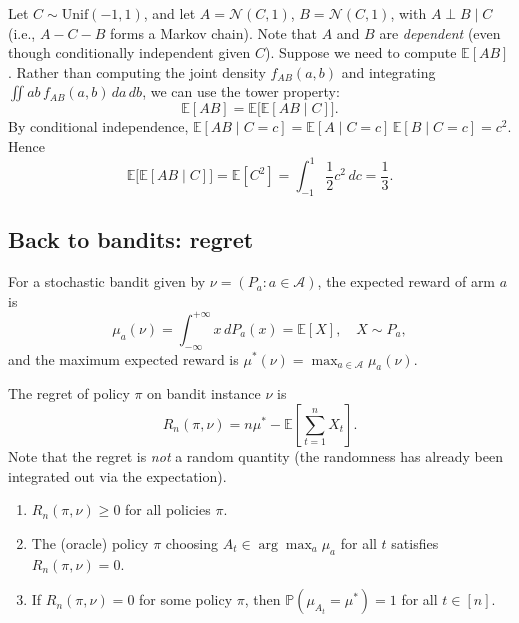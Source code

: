 \begin{example}
Let $C \sim \mathrm{Unif}(-1,1)$, and let $A = \mathcal{N}(C,1)$, $B = \mathcal{N}(C,1)$, with $A \perp B \mid C$ (i.e., $A - C - B$ forms a Markov chain). Note that $A$ and $B$ are \emph{dependent} (even though conditionally independent given $C$). Suppose we need to compute $\mathbb{E}[AB]$. Rather than computing the joint density $f_{AB}(a,b)$ and integrating $\iint ab\, f_{AB}(a,b)\, da\, db$, we can use the tower property:
\[
\mathbb{E}[AB] = \mathbb{E}\big[\mathbb{E}[AB \mid C]\big].
\]
By conditional independence, $\mathbb{E}[AB \mid C = c] = \mathbb{E}[A \mid C=c]\,\mathbb{E}[B \mid C=c] = c^2$. Hence
\[
\mathbb{E}\big[\mathbb{E}[AB \mid C]\big] = \mathbb{E}[C^2] = \int_{-1}^{1} \frac{1}{2} c^2\, dc = \frac{1}{3}.
\]
\end{example}

\subsection{Back to bandits: regret}

\begin{definition}
For a stochastic bandit given by $\nu = (P_a : a \in \mathcal{A})$, the expected reward of arm $a$ is
\[
\mu_a(\nu) = \int_{-\infty}^{+\infty} x\, dP_a(x) = \mathbb{E}[X], \quad X \sim P_a,
\]
and the maximum expected reward is $\mu^*(\nu) = \max_{a \in \mathcal{A}} \mu_a(\nu)$.
\end{definition}

\begin{definition}[Regret]
The regret of policy $\pi$ on bandit instance $\nu$ is
\[
R_n(\pi, \nu) = n\mu^* - \mathbb{E}\left[\sum_{t=1}^n X_t\right].
\]
Note that the regret is \emph{not} a random quantity (the randomness has already been integrated out via the expectation).
\end{definition}

\begin{lemma}
\begin{enumerate}
    \item[(a)] $R_n(\pi, \nu) \geq 0$ for all policies $\pi$.
    \item[(b)] The (oracle) policy $\pi$ choosing $A_t \in \arg\max_a \mu_a$ for all $t$ satisfies $R_n(\pi, \nu) = 0$.
    \item[(c)] If $R_n(\pi, \nu) = 0$ for some policy $\pi$, then $\mathbb{P}(\mu_{A_t} = \mu^*) = 1$ for all $t \in [n]$.
\end{enumerate}
\end{lemma}

